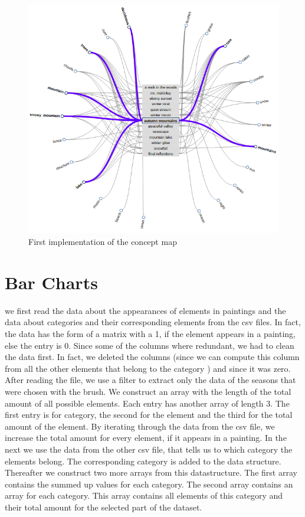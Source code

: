 \documentclass[a4paper]{tufte-book}
\newcommand{\quo}[1]{\flqq{#1}\frqq}
\begin{document}
\begin{figure}
	\includegraphics{Images/firstImplementation.png}
	\caption{First implementation of the concept map}
	\label{fig:concept2}
\end{figure}

\section{Bar Charts}
 we first read the data about the appearances of elements in paintings and the data about categories and their corresponding elements from the csv files. In fact, the data has the form of a matrix with a 1, if the element appears in a painting, else the entry is 0. Since some of the columns where redundant, we had to clean the data first. In fact, we deleted the columns \quo{frames} (since we can compute this column from all the other elements that belong to the category \quo{frames}) and \quo{lakes} since it was zero. After reading the file, we use a filter to extract only the data of the seasons that were chosen with the brush. We construct an array with the length of the total amount of all possible elements. Each entry has another array of length 3. The first entry is for category, the second for the element and the third for the total amount of the element. By iterating through the data from the csv file, we increase the total amount for every element, if it appears in a painting. In the next we use the data from the other csv file, that tells us to which category the elements belong. The corresponding category is added to the data structure. Thereafter we construct two more arrays from this datastructure. The first array contains the summed up values for each category. The second array contains an array for each category. This array contains all elements of this category and their total amount for the selected part of the dataset. \\
\end{document}
